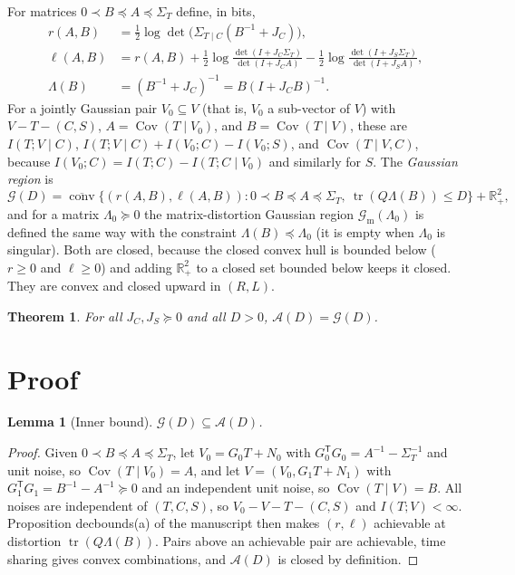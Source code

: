 \documentclass[11pt]{article}
\newtheorem{theorem}{Theorem}
\newtheorem{lemma}{Lemma}
\theoremstyle{remark}
\newcommand{\tr}{\operatorname{tr}}
\newcommand{\Cov}{\operatorname{Cov}}
\begin{document}
For matrices $0\prec B\preceq A\preceq\Sigma_T$ define, in bits,
\begin{align*}
r(A,B)&=\tfrac12\log\det\bigl(\Sigma_{T\mid C}(B^{-1}+J_C)\bigr),\\
\ell(A,B)&=r(A,B)+\tfrac12\log\frac{\det(I+J_C\Sigma_T)}{\det(I+J_CA)}-\tfrac12\log\frac{\det(I+J_S\Sigma_T)}{\det(I+J_SA)},\\
\Lambda(B)&=(B^{-1}+J_C)^{-1}=B(I+J_CB)^{-1}.
\end{align*}
For a jointly Gaussian pair $V_0\subseteq V$ (that is, $V_0$ a sub-vector of $V$) with $V-T-(C,S)$, $A=\Cov(T\mid V_0)$, and $B=\Cov(T\mid V)$, these are $I(T;V\mid C)$, $I(T;V\mid C)+I(V_0;C)-I(V_0;S)$, and $\Cov(T\mid V,C)$, because $I(V_0;C)=I(T;C)-I(T;C\mid V_0)$ and similarly for $S$. The \emph{Gaussian region} is
\[
\mathcal G(D)=\overline{\operatorname{conv}}\bigl\{(r(A,B),\ell(A,B)):0\prec B\preceq A\preceq\Sigma_T,\ \tr(Q\Lambda(B))\le D\bigr\}+\mathbb R_+^2,
\]
and for a matrix $\Lambda_0\succeq0$ the matrix-distortion Gaussian region $\mathcal G_{\mathrm m}(\Lambda_0)$ is defined the same way with the constraint $\Lambda(B)\preceq\Lambda_0$ (it is empty when $\Lambda_0$ is singular). Both are closed, because the closed convex hull is bounded below ($r\ge0$ and $\ell\ge0$) and adding $\mathbb R_+^2$ to a closed set bounded below keeps it closed. They are convex and closed upward in $(R,L)$.

\begin{theorem}\label{thm:main}
For all $J_C,J_S\succeq0$ and all $D>0$, $\mathcal A(D)=\mathcal G(D)$.
\end{theorem}

\section{Proof}

\begin{lemma}[Inner bound]\label{lem:inner}
$\mathcal G(D)\subseteq\mathcal A(D)$.
\end{lemma}

\begin{proof}
Given $0\prec B\preceq A\preceq\Sigma_T$, let $V_0=G_0T+N_0$ with $G_0^{\mathsf T}G_0=A^{-1}-\Sigma_T^{-1}$ and unit noise, so $\Cov(T\mid V_0)=A$, and let $V=(V_0,G_1T+N_1)$ with $G_1^{\mathsf T}G_1=B^{-1}-A^{-1}\succeq0$ and an independent unit noise, so $\Cov(T\mid V)=B$. All noises are independent of $(T,C,S)$, so $V_0-V-T-(C,S)$ and $I(T;V)<\infty$. Proposition decbounds(a) of the manuscript then makes $(r,\ell)$ achievable at distortion $\tr(Q\Lambda(B))$. Pairs above an achievable pair are achievable, time sharing gives convex combinations, and $\mathcal A(D)$ is closed by definition.
\end{proof}
\end{document}
